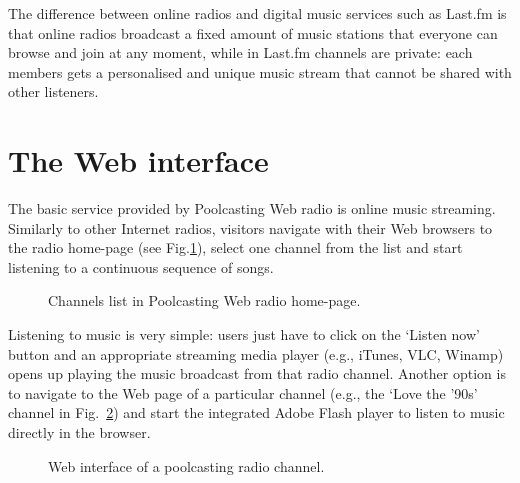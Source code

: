 The difference between online radios and digital music services such as Last.fm is that online radios broadcast a fixed amount of music stations that everyone can browse and join at any moment, while in Last.fm channels are private: each members gets a personalised and unique music stream that cannot be shared with other listeners.



% 




\section{The Web interface} %
\label{sec:innovative_features}


The basic service provided by Poolcasting Web radio is online music streaming.
Similarly to other Internet radios, visitors navigate with their Web browsers to the radio home-page (see Fig.\ref{fig:channels-list}), select one channel from the list and start listening to a continuous sequence of songs.
%
\begin{figure}[bthp]
\centering \setlength{\abovecaptionskip}{3pt}
\caption{Channels list in Poolcasting Web radio home-page.}
\label{fig:channels-list}
\end{figure}

Listening to music is very simple: users just have to click on the `Listen now' button and an appropriate streaming media player (e.g., iTunes, VLC, Winamp) opens up playing the music broadcast from that radio channel.
Another option is to navigate to the Web page of a particular channel (e.g., the `Love the '90s' channel in Fig.~\ref{fig:rock_channel}) and start the integrated Adobe Flash player to listen to music directly in the browser.
%
\begin{figure}[bthp]
\centering \setlength{\abovecaptionskip}{3pt}
\caption{Web interface of a poolcasting radio channel.}
\label{fig:rock_channel}
\end{figure}
%

